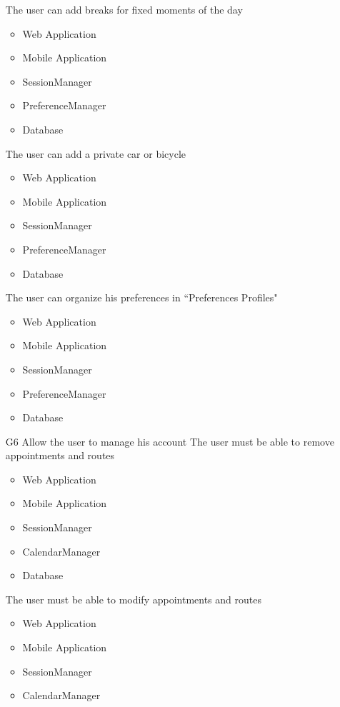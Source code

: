 \begin{itemize}
\begin{itemize}[leftmargin=1in]
 	\end{itemize}
 	\subitem[G5.8] The user can add breaks for fixed moments of the day
 	\begin{itemize}[leftmargin=1in]
 		\item Web Application
 		\item Mobile Application
 		\item SessionManager
 		\item PreferenceManager
 		\item Database
 	\end{itemize}
 	\subitem[G5.9] The user can add a private car or bicycle
 	\begin{itemize}[leftmargin=1in]
 		\item Web Application
 		\item Mobile Application
 		\item SessionManager
 		\item PreferenceManager
 		\item Database
 	\end{itemize}
 	\subitem[G5.10] The user can organize his preferences in “Preferences Profiles"
 	\begin{itemize}[leftmargin=1in]
 		\item Web Application
 		\item Mobile Application
 		\item SessionManager
 		\item PreferenceManager
 		\item Database
 	\end{itemize}
 	\item[G6] Allow the user to manage his account
 	\subitem[G6.1] The user must be able to remove appointments and routes
 	\begin{itemize}[leftmargin=1in]
 		\item Web Application
 		\item Mobile Application
 		\item SessionManager
 		\item CalendarManager
 		\item Database
 	\end{itemize}
 	\subitem[G6.2] The user must be able to modify appointments and routes
 	\begin{itemize}[leftmargin=1in]
 		\item Web Application
 		\item Mobile Application
 		\item SessionManager
 		\item CalendarManager

\end{itemize}
\end{itemize}

